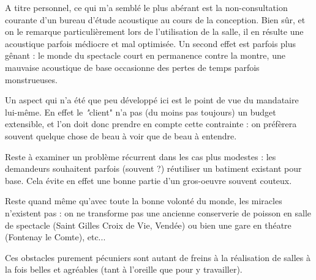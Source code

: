 \documentclass[a4paper, 11pt]{report}
\begin{document}
A titre personnel, ce qui m'a semblé le plus abérant est la non-consultation courante d'un bureau d'étude acoustique au cours de la conception.
Bien sûr, et on le remarque particulièrement lors de l'utilisation de la salle, il en résulte une acoustique parfois médiocre et mal optimisée.
Un second effet est parfois plus gênant : le monde du spectacle court en permanence contre la montre, une mauvaise acoustique de base occasionne des pertes de temps parfois monstrueuses.

Un aspect qui n'a été que peu développé ici est le point de vue du mandataire lui-même.
En effet le {\emph "client"} n'a pas (du moins pas toujours) un budget extensible, et l'on doit donc prendre en compte cette contrainte : on préfèrera souvent quelque chose de beau à voir que de beau à entendre.

Reste à examiner un problème récurrent dans les cas plus modestes : les demandeurs souhaitent parfois (souvent ?) réutiliser un batiment existant pour base.
Cela évite en effet une bonne partie d'un gros-oeuvre souvent couteux.

Reste quand même qu'avec toute la bonne volonté du monde, les miracles n'existent pas : on ne transforme pas une ancienne conserverie de poisson en salle de spectacle (Saint Gilles Croix de Vie, Vendée) ou bien une gare en théatre (Fontenay le Comte), etc...


Ces obstacles purement pécuniers sont autant de freins à la réalisation de salles à la fois belles et agréables (tant à l'oreille que pour y travailler).
\end{document}
